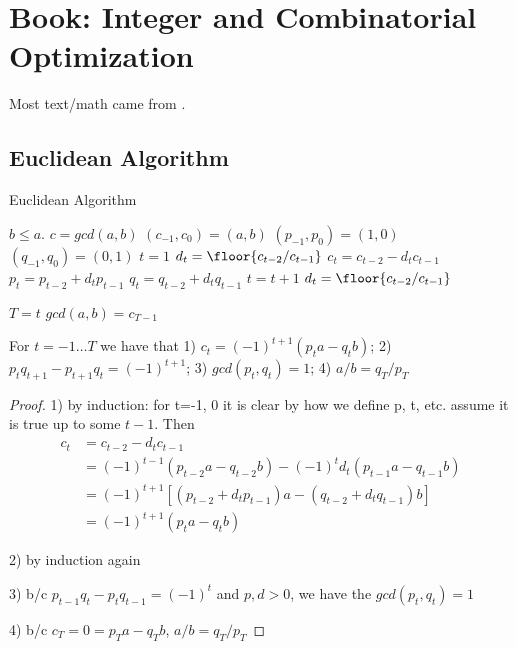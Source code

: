  \chapter{Book: Integer and Combinatorial Optimization}

Most text/math came from \cite{georgeNemhauserBook}.


\section{Euclidean Algorithm}


\begin{algorithm}                      
\caption{Euclidean Algorithm}
\label{alg:EuclideanAlgorithm}
\begin{algorithmic}                    
\REQUIRE $b \leq a$.
\ENSURE $c = gcd(a,b)$
\STATE $(c_{-1}, c_0) =(a, b)$
\STATE $(p_{-1}, p_0) =(1, 0)$
\STATE $(q_{-1}, q_0) =(0, 1)$
\STATE $t=1$
\STATE $d_t = \floor{c_{t-2}/c_{t-1}}$
	\STATE $c_t = c_{t-2} - d_t c_{t-1}$
	\STATE $p_t = p_{t-2} +d_tp_{t-1}$
	\STATE $q_t = q_{t-2} + d_tq_{t-1}$
	\STATE $t = t +1$
	\STATE $d_t = \floor{c_{t-2}/c_{t-1}}$
\ENDWHILE 

	\STATE $T = t$
\RETURN $gcd(a,b) = c_{T-1}$
\end{algorithmic}
\end{algorithm}

\begin{corollary}
For $t = -1\dots T$ we have that 1) $c_t = (-1)^{t+1}(p_ta - q_tb)$;  2) $p_tq_{t+1} - p_{t+1}q_t = (-1)^{t+1}$; 3) $gcd(p_t,q_t) = 1$; 4) $a/b = q_T/p_T$
\end{corollary}
\begin{proof}
1) by induction: for t=-1, 0 it is clear by how we define p, t, etc.
assume it is true up to some $t-1$. Then
\begin{align*}
	c_t  &= c_{t-2} - d_tc_{t-1} \\
		&= (-1)^{t-1}(p_{t-2}a - q_{t-2}b) - (-1)^td_t(p_{t-1}a - q_{t-1}b) \\
		&= (-1)^{t+1}[(p_{t-2} + d_t p_{t-1})a - (q_{t-2} +d_tq_{t-1}) b] \\
		&= (-1)^{t+1}(p_ta - q_tb)
\end{align*}

2) by induction again

3) b/c $p_{t-1}q_t - p_tq_{t-1} = (-1)^t$ and $p,d > 0$, we have the $gcd(p_t, q_t)  = 1$

4) b/c $c_T = 0 = p_Ta - q_Tb$, $a/b = q_T/p_T$
\end{proof}

